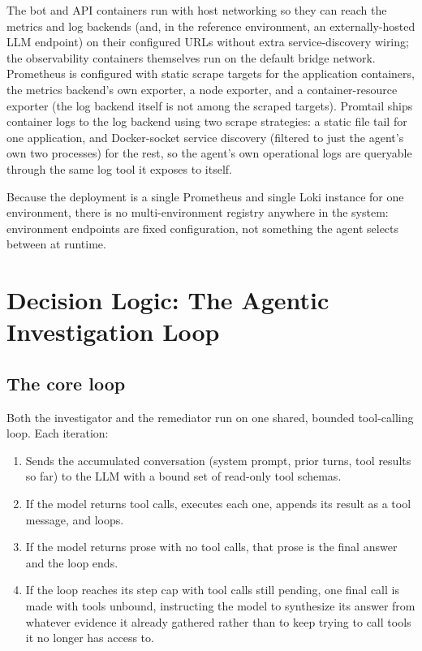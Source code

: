 \documentclass[11pt]{article}
\begin{document}
The bot and API containers run with host networking so they can reach the
metrics and log backends (and, in the reference environment, an
externally-hosted LLM endpoint) on their configured URLs without extra
service-discovery wiring; the observability containers themselves run on the
default bridge network. Prometheus is configured with static scrape targets
for the application containers, the metrics backend's own exporter, a
node exporter, and a container-resource exporter (the log backend itself is
not among the scraped targets). Promtail ships container
logs to the log backend using two scrape strategies: a static file tail for
one application, and Docker-socket service discovery (filtered to just the
agent's own two processes) for the rest, so the agent's own operational logs
are queryable through the same log tool it exposes to itself.

Because the deployment is a single Prometheus and single Loki instance for
one environment, there is no multi-environment registry anywhere in the
system: environment endpoints are fixed configuration, not something the
agent selects between at runtime.

\section{Decision Logic: The Agentic Investigation Loop}
\label{sec:decision-logic}

\subsection{The core loop}

Both the investigator and the remediator run on one shared, bounded
tool-calling loop. Each iteration:

\begin{enumerate}
  \item Sends the accumulated conversation (system prompt, prior turns, tool
    results so far) to the LLM with a bound set of read-only tool schemas.
  \item If the model returns tool calls, executes each one, appends its
    result as a tool message, and loops.
  \item If the model returns prose with no tool calls, that prose is the
    final answer and the loop ends.
  \item If the loop reaches its step cap with tool calls still pending, one
    final call is made with tools unbound, instructing the model to
    synthesize its answer from whatever evidence it already gathered rather
    than to keep trying to call tools it no longer has access to.
\end{enumerate}
\end{document}
